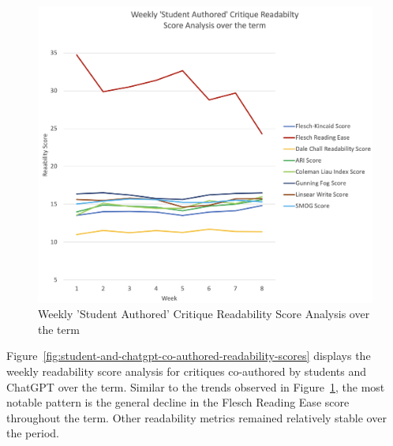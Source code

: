 \begin{figure}[h!]
	\centering
	\includegraphics[width=1.0\linewidth]{"figures/Student Authored"}
	\caption[Weekly Student Authored Critique Readability Scores]{Weekly 'Student Authored' Critique Readability Score Analysis over the term}
	\label{fig:student-authored-critique-readability-scores}
\end{figure}



Figure~\ref{fig:student-and-chatgpt-co-authored-readability-scores} displays the weekly readability score analysis for critiques co-authored by students and ChatGPT over the term. Similar to the trends observed in Figure~\ref{fig:student-authored-critique-readability-scores}, the most notable pattern is the general decline in the Flesch Reading Ease score throughout the term. Other readability metrics remained relatively stable over the period.

